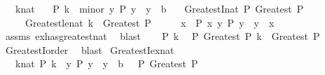 \begin{isabellebody}
\isamarkupfalse%
\isanewline
\ \ \ k{\isacharcolon}{\kern0pt}{\isacharcolon}{\kern0pt}nat\isanewline
\ \ \ {\isachardoublequoteopen}P\ k{\isachardoublequoteclose}\ \ minor{\isacharcolon}{\kern0pt}\ {\isachardoublequoteopen}{\isasymAnd}y{\isachardot}{\kern0pt}\ P\ y\ {\isasymLongrightarrow}\ y\ {\isasymle}\ b{\isachardoublequoteclose}\isanewline
\ \ \ GreatestI{\isacharunderscore}{\kern0pt}nat{\isacharcolon}{\kern0pt}\ {\isachardoublequoteopen}P\ {\isacharparenleft}{\kern0pt}Greatest\ P{\isacharparenright}{\kern0pt}{\isachardoublequoteclose}\ \isanewline
\ \ \ \ \ Greatest{\isacharunderscore}{\kern0pt}le{\isacharunderscore}{\kern0pt}nat{\isacharcolon}{\kern0pt}\ {\isachardoublequoteopen}k\ {\isasymle}\ Greatest\ P{\isachardoublequoteclose}\isanewline
%
\isadelimproof
%
\endisadelimproof
%
\isatagproof
{}\isamarkupfalse%
\ {\isacharminus}{\kern0pt}\isanewline
\ \ \isamarkupfalse%
\ x\ \ {\isachardoublequoteopen}P\ x{\isachardoublequoteclose}\ {\isachardoublequoteopen}{\isasymAnd}y{\isachardot}{\kern0pt}\ P\ y\ {\isasymLongrightarrow}\ y\ {\isasymle}\ x{\isachardoublequoteclose}\isanewline
\ \ \ \ \isamarkupfalse%
\ assms\ ex{\isacharunderscore}{\kern0pt}has{\isacharunderscore}{\kern0pt}greatest{\isacharunderscore}{\kern0pt}nat\ \isamarkupfalse%
\ blast\isanewline
\ \ \isamarkupfalse%
\ {\isacartoucheopen}P\ k{\isacartoucheclose}\ \isamarkupfalse%
\ {\isachardoublequoteopen}P\ {\isacharparenleft}{\kern0pt}Greatest\ P{\isacharparenright}{\kern0pt}{\isachardoublequoteclose}\ {\isachardoublequoteopen}k\ {\isasymle}\ Greatest\ P{\isachardoublequoteclose}\isanewline
\ \ \ \ \isamarkupfalse%
\ GreatestI{}{\isacharunderscore}{\kern0pt}order\ \isamarkupfalse%
\ blast{\isacharplus}{\kern0pt}\isanewline
{}\isamarkupfalse%
%
\endisatagproof
{\isafoldproof}%
%
\isadelimproof
\isanewline
%
\endisadelimproof
\isanewline
{}\isamarkupfalse%
\ GreatestI{\isacharunderscore}{\kern0pt}ex{\isacharunderscore}{\kern0pt}nat{\isacharcolon}{\kern0pt}\isanewline
\ \ {\isachardoublequoteopen}{\isasymlbrakk}\ {\isasymexists}k{\isacharcolon}{\kern0pt}{\isacharcolon}{\kern0pt}nat{\isachardot}{\kern0pt}\ P\ k{\isacharsemicolon}{\kern0pt}\ \ {\isasymAnd}y{\isachardot}{\kern0pt}\ P\ y\ {\isasymLongrightarrow}\ y\ {\isasymle}\ b\ {\isasymrbrakk}\ {\isasymLongrightarrow}\ P\ {\isacharparenleft}{\kern0pt}Greatest\ P{\isacharparenright}{\kern0pt}{\isachardoublequoteclose}\isanewline

\end{isabellebody}
